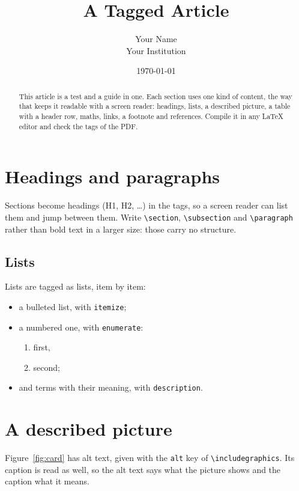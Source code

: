 \documentclass[11pt]{article}
\title{A Tagged Article}
\author{Your Name\\ Your Institution}
\date{\today}
\begin{document}
\maketitle

\begin{abstract}
  This article is a test and a guide in one. Each section uses one kind of content, the way that
  keeps it readable with a screen reader: headings, lists, a described picture, a table with a
  header row, maths, links, a footnote and references. Compile it in any LaTeX editor and check the
  tags of the PDF.
\end{abstract}

\section{Headings and paragraphs}
Sections become headings (H1, H2, \dots) in the tags, so a screen reader can list them and jump
between them. Write \verb|\section|, \verb|\subsection| and \verb|\paragraph| rather than bold
text in a larger size: those carry no structure.

\subsection{Lists}
Lists are tagged as lists, item by item:
\begin{itemize}
  \item a bulleted list, with \verb|itemize|;
  \item a numbered one, with \verb|enumerate|:
    \begin{enumerate}
      \item first,
      \item second;
    \end{enumerate}
  \item and terms with their meaning, with \verb|description|.
\end{itemize}

\section{A described picture}
Figure~\ref{fig:card} has alt text, given with the \texttt{alt} key of \texttt{\textbackslash includegraphics}.
Its caption is read as well, so the alt text says what the picture shows and the caption what it
means.
\end{document}
